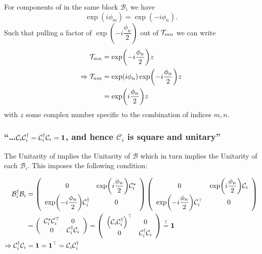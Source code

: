 \subsubsection{ }
For components of \timereversalmatrix in the same block $\mathcal{B}_i$ we have
\[\exp(i\phi_m)=\exp(-i\phi_n).\]
Such that pulling a factor of $\exp(-i\dfrac{\phi_n}{2})$ out of $\mathcal{T}_{mn}$ we can write
\begin{align*}
	\mathcal{T}_{mn}&=\exp(-i\dfrac{\phi_n}{2})z\\
	\Rightarrow \mathcal{T}_{nm}&=\exp(i\phi_n)\exp(-i\dfrac{\phi_n}{2})z\\
	&=\exp(i\dfrac{\phi_n}{2})z
\end{align*}
with $z$ some complex number specific to the combination of indices $m,n$.


\subsubsection{\enquote{\dots $\mathcal{C}_i\mathcal{C}_i^\dagger=\mathcal{C}_i^\dagger \mathcal{C}_i=\mathbf{1}$, and hence $\mathcal{C}_i$ is square and unitary} }

The Unitarity of \timereversalmatrix implies the Unitarity of $\mathcal{B}$ which in turn implies the Unitarity of each $\mathcal{B}_i$. This imposes the following condition:
\begin{widetext}
	\begin{align*}
		\mathcal{B}_i^\dagger \mathcal{B}_i&=
		\left(\begin{array}{cc}
			0	&  \exp(i\dfrac{\phi_n}{2})\mathcal{C}_i^\star\\
			\exp(-i\dfrac{\phi_n}{2})\mathcal{C}_i^\dagger	& 0
		\end{array}\right)
		\left(\begin{array}{cc}
			0	&  \exp(i\dfrac{\phi_n}{2})\mathcal{C}_i\\
			\exp(-i\dfrac{\phi_n}{2})\mathcal{C}_i^\top	& 0
		\end{array}\right)\\
	&=\left(\begin{array}{cc}
		\mathcal{C}_i^\star \mathcal{C}_i^\top	&  0\\
		0	& \mathcal{C}_i^\dagger \mathcal{C}_i
	\end{array}\right)
=\left(\begin{array}{cc}
\left(	\mathcal{C}_i \mathcal{C}_i^\dagger \right)^\top	&  0\\
 	0	& \mathcal{C}_i^\dagger \mathcal{C}_i
\end{array}\right)
\overset{!}{=}\mathbf{1}\\
\Rightarrow \mathcal{C}_i^\dagger \mathcal{C}_i&=\mathbf{1}=\mathbf{1}^\top=\mathcal{C}_i\mathcal{C}_i^\dagger
	\end{align*}
\end{widetext}



